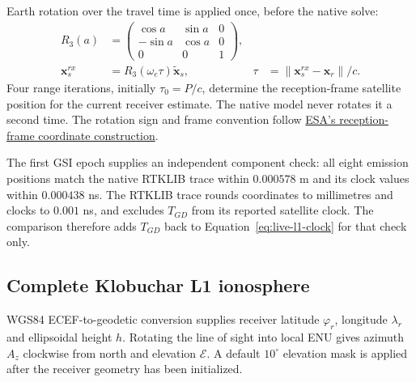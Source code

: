Earth rotation over the travel time is applied once, before the native solve:
\begin{align}
 R_3(a)&=\begin{pmatrix}\cos a&\sin a&0\\-\sin a&\cos a&0\\0&0&1\end{pmatrix},\\
 \boldsymbol x_s^{rx}&=R_3(\omega_e\tau)\widetilde{\boldsymbol x}_s,
 &\tau&=\|\boldsymbol x_s^{rx}-\boldsymbol x_r\|/c.
 \label{eq:live-earth-rotation}
\end{align}
Four range iterations, initially $\tau_0=P/c$, determine the reception-frame
satellite position for the current receiver estimate. The native model never
rotates it a second time. The rotation sign and frame convention follow
\href{https://gssc.esa.int/navipedia/index.php/Satellite_Coordinates_Computation}{ESA's
reception-frame coordinate construction}.

The first GSI epoch supplies an independent component check: all eight
emission positions match the native RTKLIB trace within $0.000578$ m and its
clock values within $0.000438$ ns. The RTKLIB trace rounds coordinates to
millimetres and clocks to $0.001$ ns, and excludes $T_{GD}$ from its reported
satellite clock. The comparison therefore adds $T_{GD}$ back to
Equation~\eqref{eq:live-l1-clock} for that check only.

\clearpage
\subsection{Complete Klobuchar L1 ionosphere}
\label{sec:live-ionosphere}

WGS84 ECEF-to-geodetic conversion supplies receiver latitude $\varphi_r$,
longitude $\lambda_r$ and ellipsoidal height $h$. Rotating the line of sight
into local ENU gives azimuth $A_z$ clockwise from north and elevation
$\mathcal E$. A default $10^\circ$ elevation mask is applied after the receiver
geometry has been initialized.

